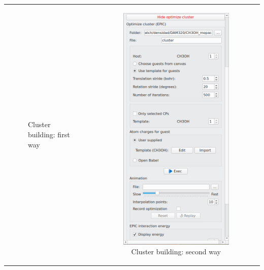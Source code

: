 \documentclass[10pt]{article}
\begin{document}
\begin{tabular}{lcr}
\begin{minipage}{.3\linewidth}
\begin{figure}[H]
\begin{center}
        \end{center}
        \vspace*{3mm}
        \caption{Cluster building: first way\label{fig:4_10_1}}
    \end{figure}
\end{minipage}
&
\begin{minipage}{.3\linewidth}
    \begin{figure}[H]
        \begin{center}
            \vspace*{0mm}
            \includegraphics[width=0.68\linewidth]{damqt320_mespimizer_2.png}
        \end{center}
        \vspace*{3mm}
        \caption{Cluster building: second way\label{fig:4_10_2}}

\end{figure}
\end{minipage}
\end{tabular}
\end{document}
